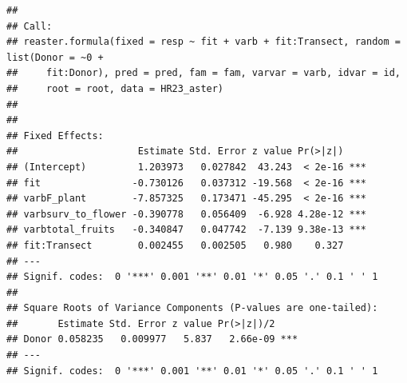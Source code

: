 \documentclass[
]{article}
\begin{document}
\begin{verbatim}
## 
## Call:
## reaster.formula(fixed = resp ~ fit + varb + fit:Transect, random = list(Donor = ~0 + 
##     fit:Donor), pred = pred, fam = fam, varvar = varb, idvar = id, 
##     root = root, data = HR23_aster)
## 
## 
## Fixed Effects:
##                     Estimate Std. Error z value Pr(>|z|)    
## (Intercept)         1.203973   0.027842  43.243  < 2e-16 ***
## fit                -0.730126   0.037312 -19.568  < 2e-16 ***
## varbF_plant        -7.857325   0.173471 -45.295  < 2e-16 ***
## varbsurv_to_flower -0.390778   0.056409  -6.928 4.28e-12 ***
## varbtotal_fruits   -0.340847   0.047742  -7.139 9.38e-13 ***
## fit:Transect        0.002455   0.002505   0.980    0.327    
## ---
## Signif. codes:  0 '***' 0.001 '**' 0.01 '*' 0.05 '.' 0.1 ' ' 1
## 
## Square Roots of Variance Components (P-values are one-tailed):
##       Estimate Std. Error z value Pr(>|z|)/2    
## Donor 0.058235   0.009977   5.837   2.66e-09 ***
## ---
## Signif. codes:  0 '***' 0.001 '**' 0.01 '*' 0.05 '.' 0.1 ' ' 1
\end{verbatim}
\end{document}
